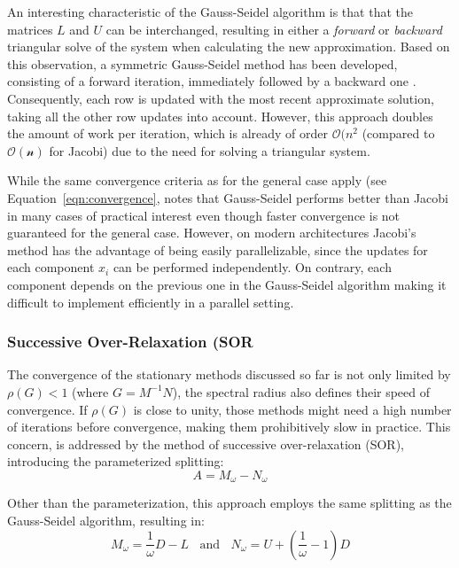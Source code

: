\noindent An interesting characteristic of the Gauss-Seidel algorithm is that that the matrices $L$ and $U$ can be interchanged, resulting in either a \textit{forward} or \textit{backward} triangular solve of the system when calculating the new approximation. Based on this observation, a symmetric Gauss-Seidel method has been developed, consisting of a forward iteration, immediately followed by a backward one \cite{saad_iterative_2003}. Consequently, each row is updated with the most recent approximate solution, taking all the other row updates into account. However, this approach doubles the amount of work per iteration, which is already of order $\mathcal{O}(n^2$ (compared to $\mathcal{O(n)}$ for Jacobi) due to the need for solving a triangular system. 

While the same convergence criteria as for the general case apply (see Equation~\hyperref[eqn:convergence]{\ref{eqn:convergence}}, \cite{venit_convergence_1975} notes that Gauss-Seidel performs better than Jacobi in many cases of practical interest even though faster convergence is not guaranteed for the general case. However, on modern architectures Jacobi's method has the advantage of being easily parallelizable, since the updates for each component $x_i$ can be performed independently. On contrary, each component depends on the previous one in the Gauss-Seidel algorithm making it difficult to implement efficiently in a parallel setting.

\subsubsection{Successive Over-Relaxation (SOR}
The convergence of the stationary methods discussed so far is not only limited by $\rho(G)<1$ (where $G=M^{-1}N$), the spectral radius also defines their speed of convergence. If $\rho(G)$ is close to unity, those methods might need a high number of iterations before convergence, making them prohibitively slow in practice. This concern, is addressed by the method of successive over-relaxation (SOR), introducing the parameterized splitting:
\begin{equation}
    A=M_\omega - N_\omega
\end{equation}

\noindent Other than the parameterization, this approach employs the same splitting as the Gauss-Seidel algorithm, resulting in:
\begin{equation}
    M_\omega=\frac{1}\omega{}D-L \;\;\text{ and } \;\; N_\omega=U+\left(\frac{1}{\omega}-1\right)D
\end{equation}

